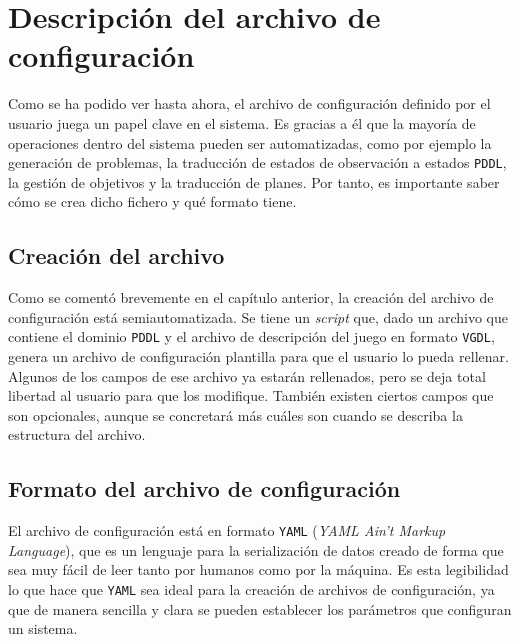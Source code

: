 
\chapter{Descripción del archivo de configuración}

Como se ha podido ver hasta ahora, el archivo de configuración definido por el usuario
juega un papel clave en el sistema. Es gracias a él que la mayoría de operaciones dentro
del sistema pueden ser automatizadas, como por ejemplo la generación de problemas, la
traducción de estados de observación a estados \texttt{PDDL}, la gestión de objetivos
y la traducción de planes. Por tanto, es importante saber cómo se crea dicho fichero
y qué formato tiene.

\section{Creación del archivo}

Como se comentó brevemente en el capítulo anterior, la creación del archivo de configuración
está semiautomatizada. Se tiene un \textit{script} que, dado un archivo que contiene el dominio
\texttt{PDDL} y el archivo de descripción del juego en formato \texttt{VGDL}, genera un archivo
de configuración plantilla para que el usuario lo pueda rellenar. Algunos de los campos de
ese archivo ya estarán rellenados, pero se deja total libertad al usuario para que los modifique.
También existen ciertos campos que son opcionales, aunque se concretará más cuáles son cuando
se describa la estructura del archivo.

\section{Formato del archivo de configuración}

El archivo de configuración está en formato \texttt{YAML} (\textit{YAML Ain't Markup Language}),
que es un lenguaje para la serialización de datos creado de forma que sea muy fácil de leer tanto
por humanos como por la máquina. Es esta legibilidad lo que hace que \texttt{YAML} sea ideal para
la creación de archivos de configuración, ya que de manera sencilla y clara se pueden establecer
los parámetros que configuran un sistema.

